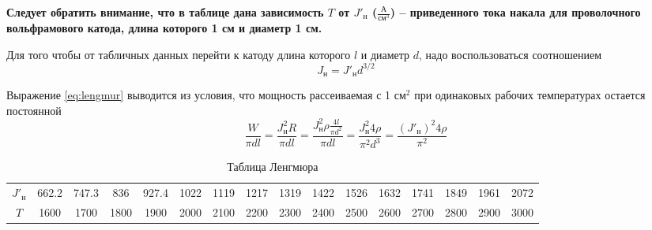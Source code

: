 \textbf{
    Следует обратить внимание, что в таблице дана зависимость  $T$ от
    $J'_{\text{н}}$  ($\frac{\text{А}}{\text{см}^3}$) -- приведенного тока
    накала для проволочного вольфрамового катода, длина которого 1 см и диаметр
    1 см. 
} 

Для того чтобы от табличных данных перейти к катоду длина которого $l$ и
диаметр $d$, надо воспользоваться соотношением
\begin{equation}
    \label{eq:lengmur}
    J_{\text{н}} = J'_{\text{н}} d^{3 / 2}
\end{equation}

Выражение \eqref{eq:lengmur} выводится из условия, что мощность рассеиваемая с
1 $\text{см}^2$ при одинаковых рабочих температурах остается постоянной
 \begin{equation}
     \frac{W}{\pi d l} = \frac{J_{\text{н}}^2 R}{\pi d l} = \frac{J^2_{\text{н}}
     \rho \frac{4l}{\pi d^2}}{\pi d l} = \frac{J^2_{\text{н}} 4 \rho}{\pi^2
 d^3} = \frac{(J'_{\text{н}})^2 4 \rho}{\pi^2}
\end{equation}

\begin{table}[h]
    \centering
    \caption{Таблица Ленгмюра}
    \label{tab:lengmur}
    \footnotesize
    \begin{tabular}{||c||c|c|c|c|c|c|c|c|c|c|c|c|c|c|c|}
        \hline
        $J'_{\text{н}}$ & 662.2 & 747.3 & 836   & 927.4 & 1022  & 1119  & 1217  & 1319  & 1422  &
        1526  & 1632  & 1741  & 1849  & 1961  & 2072   \\

        $T$ & 1600 & 1700 & 1800 & 1900 & 2000 & 2100 & 2200 & 2300 & 2400 & 2500 &
        2600 & 2700 & 2800 & 2900 & 3000 \\
        \hline
    \end{tabular}
\end{table}




